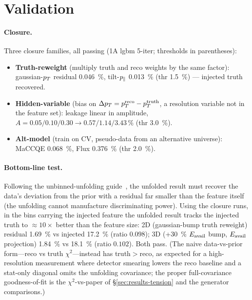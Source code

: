 \section{Validation}
\label{sec:validation}

\paragraph{Closure.}
Three closure families, all passing (1A lgbm 5-iter; thresholds in parentheses):
\begin{itemize}
  \item \textbf{Truth-reweight} (multiply truth and reco weights by the same
        factor): gaussian-$p_{T}$ residual \SI{0.046}{\percent}, tilt-$p_{\parallel}$
        \SI{0.013}{\percent} (thr \SI{1.5}{\percent}) --- injected truth recovered.
  \item \textbf{Hidden-variable} (bias on $\Delta p_{T}=p_{T}^{\mathrm{reco}}-p_{T}^{\mathrm{truth}}$,
        a resolution variable not in the feature set): leakage linear in amplitude,
        $A=0.05/0.10/0.30\to0.57/1.14/3.43\,\%$ (thr \SI{3.0}{\percent}).
  \item \textbf{Alt-model} (train on CV, pseudo-data from an alternative universe):
        MaCCQE \SI{0.068}{\percent}, Flux \SI{0.376}{\percent} (thr \SI{2.0}{\percent}).
\end{itemize}

\paragraph{Bottom-line test.}
Following the unbinned-unfolding guide~\cite{unbinnedguide}, the unfolded result must
recover the data's deviation from the prior with a residual far smaller than the feature
itself (the unfolding cannot manufacture discriminating power). Using the closure runs,
in the bins carrying the injected feature the unfolded result tracks the injected truth to
$\approx10\times$ better than the feature size: 2D (gaussian-bump truth reweight) residual
\SI{1.69}{\percent} vs injected \SI{17.2}{\percent} (ratio $0.098$); 3D (+\SI{30}{\percent}
$E_{\mathrm{avail}}$ bump, $E_{\mathrm{avail}}$ projection) \SI{1.84}{\percent} vs \SI{18.1}{\percent} (ratio
$0.102$). Both pass.
(The naive data-vs-prior form---reco vs truth $\chi^2$---instead has truth$>$reco, as
expected for a high-resolution measurement where detector smearing lowers the reco baseline
and a stat-only diagonal omits the unfolding covariance; the proper full-covariance
goodness-of-fit is the $\chi^2$-vs-paper of \S\ref{sec:results-tension} and the generator
comparisons.)

